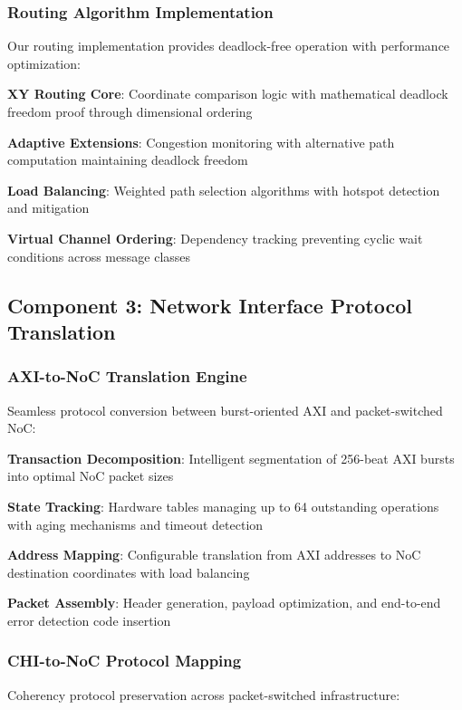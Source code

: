 \documentclass[11pt,a4paper]{article}
\begin{document}
\subsubsection{Routing Algorithm Implementation}
Our routing implementation provides deadlock-free operation with performance optimization:

\begin{techlist}
    \item \textbf{XY Routing Core}: Coordinate comparison logic with mathematical deadlock freedom proof through dimensional ordering
    \item \textbf{Adaptive Extensions}: Congestion monitoring with alternative path computation maintaining deadlock freedom
    \item \textbf{Load Balancing}: Weighted path selection algorithms with hotspot detection and mitigation
    \item \textbf{Virtual Channel Ordering}: Dependency tracking preventing cyclic wait conditions across message classes
\end{techlist}

\subsection{Component 3: Network Interface Protocol Translation}

\subsubsection{AXI-to-NoC Translation Engine}
Seamless protocol conversion between burst-oriented AXI and packet-switched NoC:

\begin{techlist}
    \item \textbf{Transaction Decomposition}: Intelligent segmentation of 256-beat AXI bursts into optimal NoC packet sizes
    \item \textbf{State Tracking}: Hardware tables managing up to 64 outstanding operations with aging mechanisms and timeout detection
    \item \textbf{Address Mapping}: Configurable translation from AXI addresses to NoC destination coordinates with load balancing
    \item \textbf{Packet Assembly}: Header generation, payload optimization, and end-to-end error detection code insertion
\end{techlist}

\subsubsection{CHI-to-NoC Protocol Mapping}
Coherency protocol preservation across packet-switched infrastructure:
\end{document}
